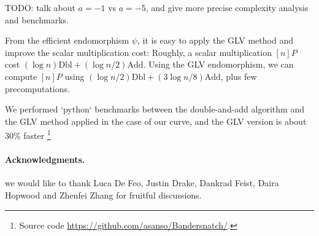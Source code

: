 \documentclass{amsart}
\newcommand{\SM}[1]{\color{blue}#1\color{black}}
\begin{document}
\SM{TODO: talk about $a=-1$ vs $a=-5$, and give more precise complexity
analysis and benchmarks.}

From the efficient endomorphism $\psi$, it is easy to apply the GLV method and improve the scalar multiplication cost:
Roughly, a scalar multiplication $[n]P$ cost $(\log n) \text{Dbl} + (\log n/2) \text{Add}$.
Using the GLV endomorphism, we can compute $[n]P$ using $(\log n/2 )\text{Dbl} + (3\log n/8) \text{Add}$, plus few precomputations.

We performed `python` benchmarks between the double-and-add algorithm and the GLV method applied in the case of our curve, and the GLV version is about 30\% faster 
\footnote{Source code \url{https://github.com/asanso/Bandersnatch/}.}

\bigskip
\paragraph*{\textbf{Acknowledgments.}} we would like to thank Luca De Feo, Justin Drake, Dankrad Feist, Daira Hopwood and Zhenfei Zhang for fruitful discussions.



\end{document}
